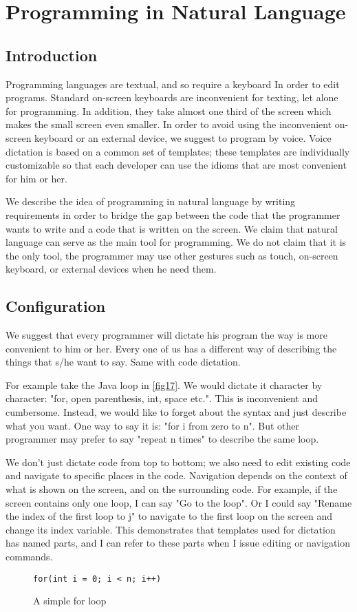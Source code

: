 \chapter{Programming in Natural Language}
\section{Introduction}
Programming languages are textual, and so require a keyboard In order to edit programs. Standard on-screen keyboards are inconvenient for texting, let alone for programming. In addition, they take almost one third of the screen which makes the small screen even smaller. In order to avoid using the inconvenient on-screen keyboard or an external device, we suggest to program by voice. Voice dictation is based on a common set of templates; these templates are individually customizable so that each developer can use the idioms that are most convenient for him or her.

We describe the idea of programming in natural language by writing requirements in order to bridge the gap between the code that the programmer wants to write and a code that is written on the screen. We claim that natural language can serve as the main tool for programming. We do not claim that it is the only tool, the programmer may use other gestures such as touch, on-screen keyboard, or external devices when he need them.

\section{Configuration}
We suggest that every programmer will dictate his program the way is more convenient to him or her. Every one of us has a different way of describing the things that s/he want to say. Same with code dictation.

For example take the Java loop in \autoref{fig17}. We would dictate it character by character: "for, open parenthesis, int, space etc.". This is inconvenient and cumbersome. Instead, we would like to forget about the syntax and just describe what you want. One way to say it is: "for i from zero to n". But other programmer may prefer to say "repeat n times" to describe the same loop.

We don't just dictate code from top to bottom; we also need to edit existing code and navigate to specific places in the code. Navigation depends on the context of what is shown on the screen, and on the surrounding code. For example, if the screen contains only one loop, I can say "Go to the loop". Or I could say "Rename the index of the first loop to j" to navigate to the first loop on the screen and change its index variable. This demonstrates that templates used for dictation has named parts, and I can refer to these parts when I issue editing or navigation commands.
\begin{figure}[H]
\begin{lstlisting}
for(int i = 0; i < n; i++)
\end{lstlisting}
\caption{A simple for loop}
\label{fig17}
\end{figure}

